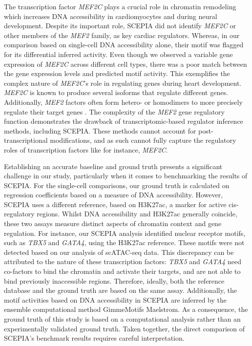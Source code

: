 The transcription factor \textit{MEF2C} plays a crucial role in chromatin remodeling which increases DNA accessibility in cardiomyocytes\cite{Stone2019,Ieda2010,Desjardins2016} and during neural development\cite{Li2008}. Despite its important role, SCEPIA did not identify \textit{MEF2C} or other members of the \textit{MEF2} family, as key cardiac regulators. Whereas, in our comparison based on single-cell DNA accessibility alone, their motif was flagged for its differential inferred activity. Even though we observed a variable gene expression of \textit{MEF2C} across different cell types, there was a poor match between the gene expression levels and predicted motif activity. This exemplifies the complex nature of \textit{MEF2C}'s role in regulating genes during heart development. \textit{MEF2C} is known to produce several isoforms that regulate different genes\cite{Zhu2004}. Additionally, \textit{MEF2} factors often form hetero- or homodimers to more precisely regulate their target genes \cite{Desjardins2016,Black1998}. The complexity of the \textit{MEF2} gene regulatory function demonstrates the drawback of transcriptomic-based regulator inference methods, including SCEPIA. These methods cannot account for post-transcriptional modifications, and as such cannot fully capture the regulatory roles of transcription factors like for instance, \textit{MEF2C}.

Establishing an accurate baseline and ground truth presents a significant challenge in our study, particularly when it comes to benchmarking the results of SCEPIA. For the single-cell comparisons, our ground truth is calculated on regression coefficients based on a measure of DNA accessibility. However, SCEPIA uses a different reference, based on H3K27ac, a marker for active cis-regulatory regions. Whilst DNA accessibility and H3K27ac generally coincide, these two assays measure distinct aspects of chromatin context and gene regulation. For instance, our SCEPIA analysis identified nuclear receptor motifs, such as \textit{TBX5} and \textit{GATA4}, using the H3K27ac reference. These motifs were not detected based on our analysis of scATAC-seq data. This discrepancy can be attributed to the nature of these transcription factors: \textit{TBX5} and \textit{GATA4} need co-factors to bind the chromatin and activate their targets, and are not able to bind previously inaccessible regions\cite{Stone2019}. Therefore, ideally, both the reference database and the ground truth are based on the same assay. Additionally, the motif activities based on DNA accessibility in SCEPIA are inferred by the ensemble computational method GimmeMotifs Maelstrom\cite{Bruse_2018}. As a consequence, the ground truth of this study is based on a computational analysis rather than an experimentally validated ground truth. Taken together, the direct comparison of SCEPIA's benchmark results requires careful interpretation.

